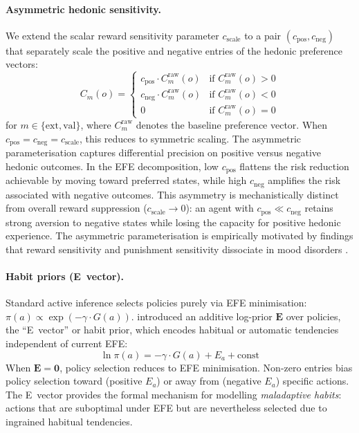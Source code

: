 \documentclass[11pt,a4paper]{article}
\begin{document}
\paragraph{Asymmetric hedonic sensitivity.} We extend the scalar reward sensitivity parameter $c_{\text{scale}}$ to a pair $(c_{\text{pos}}, c_{\text{neg}})$ that separately scale the positive and negative entries of the hedonic preference vectors:
\begin{equation}
    C_m(o) = \begin{cases}
        c_{\text{pos}} \cdot C_m^{\text{raw}}(o) & \text{if } C_m^{\text{raw}}(o) > 0 \\
        c_{\text{neg}} \cdot C_m^{\text{raw}}(o) & \text{if } C_m^{\text{raw}}(o) < 0 \\
        0 & \text{if } C_m^{\text{raw}}(o) = 0
    \end{cases}
\end{equation}
for $m \in \{\text{ext}, \text{val}\}$, where $C_m^{\text{raw}}$ denotes the baseline preference vector. When $c_{\text{pos}} = c_{\text{neg}} = c_{\text{scale}}$, this reduces to symmetric scaling. The asymmetric parameterisation captures differential precision on positive versus negative hedonic outcomes. In the EFE decomposition, low $c_{\text{pos}}$ flattens the risk reduction achievable by moving toward preferred states, while high $c_{\text{neg}}$ amplifies the risk associated with negative outcomes. This asymmetry is mechanistically distinct from overall reward suppression ($c_{\text{scale}} \to 0$): an agent with $c_{\text{pos}} \ll c_{\text{neg}}$ retains strong aversion to negative states while losing the capacity for positive hedonic experience. The asymmetric parameterisation is empirically motivated by findings that reward sensitivity and punishment sensitivity dissociate in mood disorders \citep{eshel2010reward, pizzagalli2014depression}.

\paragraph{Habit priors (E~vector).} Standard active inference selects policies purely via EFE minimisation: $\pi(a) \propto \exp(-\gamma \cdot G(a))$. \citet{dacosta2020active} introduced an additive log-prior $\mathbf{E}$ over policies, the ``E~vector'' or habit prior, which encodes habitual or automatic tendencies independent of current EFE:
\begin{equation}\label{eq:e_vector}
    \ln \pi(a) = -\gamma \cdot G(a) + E_a + \text{const}
\end{equation}
When $\mathbf{E} = \mathbf{0}$, policy selection reduces to EFE minimisation. Non-zero entries bias policy selection toward (positive $E_a$) or away from (negative $E_a$) specific actions. The E~vector provides the formal mechanism for modelling \emph{maladaptive habits}: actions that are suboptimal under EFE but are nevertheless selected due to ingrained habitual tendencies.
\end{document}
